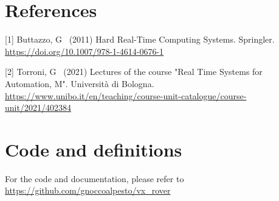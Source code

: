 \documentclass{article}
\begin{document}


\vspace{2cm}
\section*{References}                               \label{ref}

\medskip

{
[1] Buttazzo, G \ (2011) Hard Real-Time Computing Systems. Springler.\\ \url{https://doi.org/10.1007/978-1-4614-0676-1}

[2] Torroni, G \ (2021) Lectures of the course "Real Time Systems for Automation, M". Università di Bologna.\\ \url{https://www.unibo.it/en/teaching/course-unit-catalogue/course-unit/2021/402384}
}




\appendix

\vspace{2cm}
\section{Code and definitions}                      \label{code}

For the code and documentation, please refer to\\ \url{https://github.com/gnoccoalpesto/vx_rover}
\end{document}
